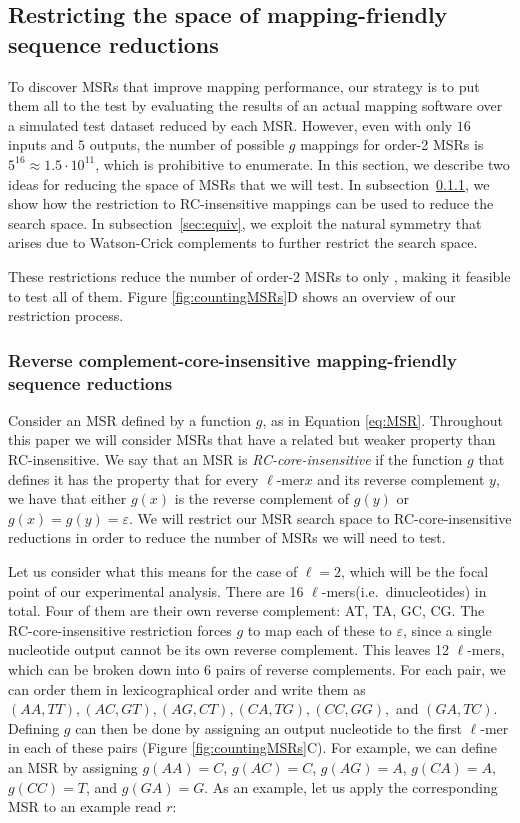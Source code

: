 \documentclass[
  11,
]{scrbook}
\begin{document}
\hypertarget{sec:enum}{%
\subsection{Restricting the space of mapping-friendly sequence reductions}\label{sec:enum}}

To discover MSRs that improve mapping performance, our strategy is to
put them all to the test by evaluating the results of an actual mapping
software over a simulated test dataset reduced by each MSR. However,
even with only \(16\) inputs and \(5\) outputs, the number of possible \(g\)
mappings for order-2 MSRs is \(5^{16}\approx 1.5\cdot10^{11}\), which is
prohibitive to enumerate. In this section, we describe two ideas for
reducing the space of MSRs that we will test. In
subsection~\ref{sec:rc-insensitive}, we show how the restriction to
RC-insensitive mappings can be used to reduce the search space. In
subsection~\ref{sec:equiv}, we exploit the natural symmetry that arises due
to Watson-Crick complements to further restrict the search space.

These restrictions reduce the number of order-2 MSRs to only , making it
feasible to test all of them.
Figure \ref{fig:countingMSRs}D shows an overview of our restriction
process.

\hypertarget{sec:rc-insensitive}{%
\subsubsection{Reverse complement-core-insensitive mapping-friendly sequence reductions}\label{sec:rc-insensitive}}

Consider an MSR defined by a function \(g\), as in Equation \eqref{eq:MSR}.
Throughout this paper we will consider MSRs that have a related but
weaker property than RC-insensitive. We say that an MSR is
\emph{RC-core-insensitive} if the function \(g\) that defines it has the
property that for every \(\ell\)-mer\(x\) and its reverse complement \(y\), we
have that either \(g(x)\) is the reverse complement of \(g(y)\) or
\(g(x) = g(y) = \varepsilon\). We will restrict our MSR search space to
RC-core-insensitive reductions in order to reduce the number of MSRs we
will need to test.

Let us consider what this means for the case of \(\ell=2\), which will be
the focal point of our experimental analysis. There are 16
\(\ell\)-mers(i.e.~dinucleotides) in total. Four of them are their own
reverse complement: AT, TA, GC, CG. The RC-core-insensitive restriction
forces \(g\) to map each of these to \(\varepsilon\), since a single
nucleotide output cannot be its own reverse complement. This leaves 12
\(\ell\)-mers, which can be broken down into 6 pairs of reverse
complements. For each pair, we can order them in lexicographical order
and write them as \((AA,TT), (AC,GT), (AG,CT), (CA,TG), (CC,GG),\) and
\((GA,TC)\). Defining \(g\) can then be done by assigning an output
nucleotide to the first \(\ell\)-mer in each of these pairs
(Figure \ref{fig:countingMSRs}C). For example, we can define an MSR by
assigning \(g(AA) = C\), \(g(AC) = C\), \(g(AG) = A\), \(g(CA) = A\),
\(g(CC) = T\), and \(g(GA) = G\). As an example, let us apply the
corresponding MSR to an example read \(r\):
\end{document}
